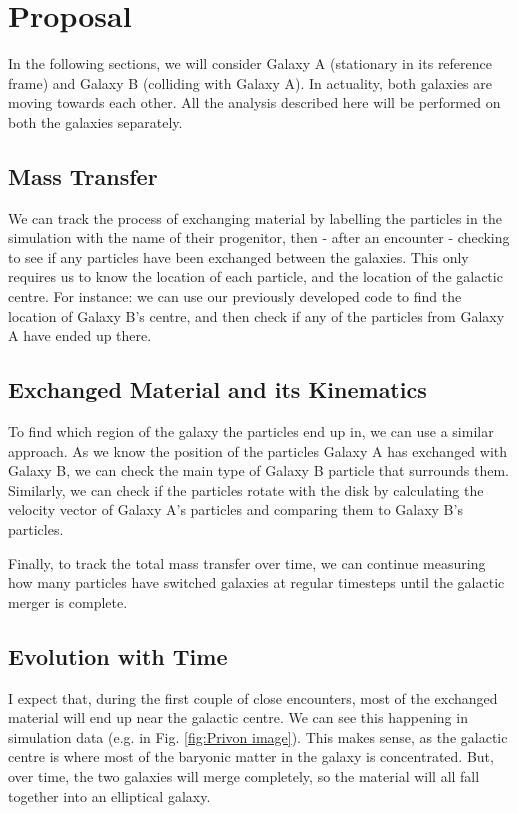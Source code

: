 \documentclass[linenumbers]{aastex631} %
\begin{document}
\section{Proposal}

In the following sections, we will consider Galaxy A (stationary in its reference frame) and Galaxy B (colliding with Galaxy A). In actuality, both galaxies are moving towards each other. All the analysis described here will be performed on both the galaxies separately.

\subsection{Mass Transfer}

We can track the process of exchanging material by labelling the particles in the simulation with the name of their progenitor, then - after an encounter - checking to see if any particles have been exchanged between the galaxies. This only requires us to know the location of each particle, and the location of the galactic centre. For instance: we can use our previously developed code to find the location of Galaxy B's centre, and then check if any of the particles from Galaxy A have ended up there.

\subsection{Exchanged Material and its Kinematics}

To find which region of the galaxy the particles end up in, we can use a similar approach. As we know the position of the particles Galaxy A has exchanged with Galaxy B, we can check the main type of Galaxy B particle that surrounds them. Similarly, we can check if the particles rotate with the disk by calculating the velocity vector of Galaxy A's particles and comparing them to Galaxy B's particles. 

Finally, to track the total mass transfer over time, we can continue measuring how many particles have switched galaxies at regular timesteps until the galactic merger is complete.

\subsection{Evolution with Time}

I expect that, during the first couple of close encounters, most of the exchanged material will end up near the galactic centre. We can see this happening in simulation data (e.g. in Fig. \ref{fig:Privon image}). This makes sense, as the galactic centre is where most of the baryonic matter in the galaxy is concentrated. But, over time, the two galaxies will merge completely, so the material will all fall together into an elliptical galaxy.
\end{document}
